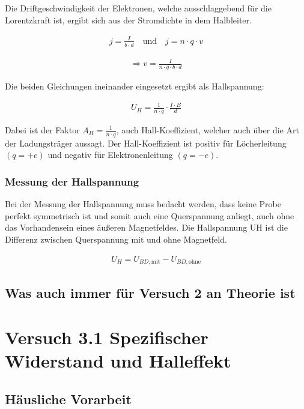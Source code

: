 \documentclass[a4paper]{scrartcl}
\numberwithin{equation}{subsection}
\begin{document}
Die Driftgeschwindigkeit der Elektronen, welche ausschlaggebend für die Lorentzkraft ist, ergibt sich aus der Stromdichte in dem Halbleiter. \cite{anl}

\begin{align}
j = \frac{I}{b \cdot d} \quad \text{und} \quad j = n \cdot q \cdot v
\end{align}

\begin{align}
\Rightarrow v = \frac{I}{n \cdot q \cdot b \cdot d}
\end{align}

Die beiden Gleichungen ineinander eingesetzt ergibt als Hallspannung:

\begin{align}
U_H = \frac{1}{n \cdot q} \cdot \frac{I \cdot B}{d}
\end{align}

Dabei ist der Faktor $A_H = \frac{1}{n \cdot q}$, auch Hall-Koeffizient, welcher auch über die Art der Ladungsträger aussagt. Der Hall-Koeffizient ist positiv für Löcherleitung $(q = +e)$ und negativ für Elektronenleitung $(q = -e)$. \cite{anl}

\subsubsection{Messung der Hallspannung}

Bei der Messung der Hallspannung muss bedacht werden, dass keine Probe perfekt symmetrisch ist und somit auch eine Querspannung anliegt, auch ohne das Vorhandensein eines äußeren Magnetfeldes. Die Hallspannung UH ist die Differenz zwischen Querspannung mit und ohne Magnetfeld. \cite{anl}

\begin{align}
U_H = U_{BD,\text{mit}} - U_{BD,\text{ohne}}
\end{align}

\subsection{Was auch immer für Versuch 2 an Theorie ist}


\newpage

\section{Versuch 3.1 Spezifischer Widerstand und Halleffekt}
\subsection{Häusliche Vorarbeit}
\end{document}

